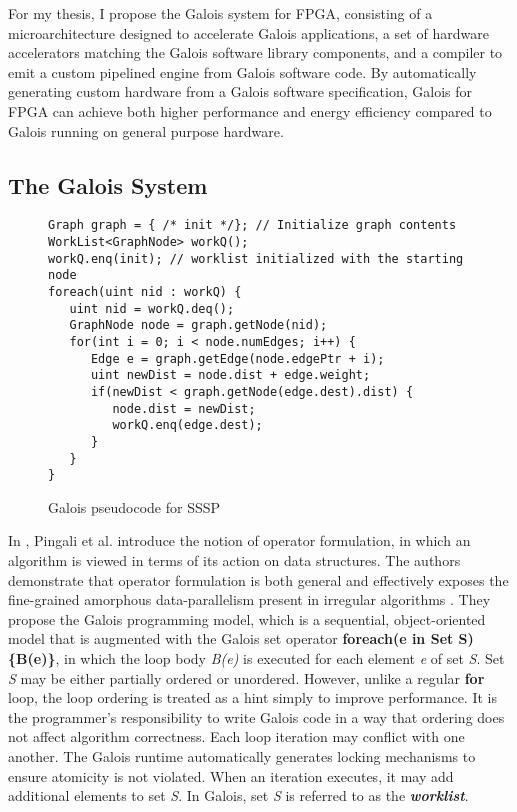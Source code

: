 For my thesis, I propose the Galois system for FPGA, consisting of a microarchitecture designed to accelerate 
Galois applications, a set of hardware accelerators matching the Galois software library components, and a compiler 
to emit a custom pipelined engine from Galois software code. By automatically generating custom hardware from a 
Galois software specification, Galois for FPGA can achieve both higher performance and energy efficiency compared to 
Galois running on general purpose hardware.


\subsection{The Galois System}


\begin{figure}
\centering
\lstset{language=Java}
\begin{lstlisting}
Graph graph = { /* init */}; // Initialize graph contents
WorkList<GraphNode> workQ();
workQ.enq(init); // worklist initialized with the starting node
foreach(uint nid : workQ) {
   uint nid = workQ.deq();
   GraphNode node = graph.getNode(nid);
   for(int i = 0; i < node.numEdges; i++) {
      Edge e = graph.getEdge(node.edgePtr + i);
      uint newDist = node.dist + edge.weight;
      if(newDist < graph.getNode(edge.dest).dist) {
         node.dist = newDist;
         workQ.enq(edge.dest);
      }
   }
}
\end{lstlisting}
\caption{Galois pseudocode for SSSP}
\label{fig:ssspSource}
\end{figure}

In \cite{galois}, Pingali et al. introduce the notion of operator formulation, in which an algorithm is viewed in 
terms of its action on data structures. The authors demonstrate that operator formulation is both general 
\cite{galoisAlgorithms} and effectively exposes the fine-grained amorphous data-parallelism present in irregular 
algorithms \cite{galoisPerf}. They 
propose the Galois programming model, which is a sequential, object-oriented model that is augmented with the 
Galois set operator \textbf{foreach(e in Set S) \{B(e)\}}, in which the loop body \textit{B(e)} is executed for each 
element \textit{e} of set \textit{S}. Set \textit{S} may be either partially ordered or unordered. However, unlike 
a regular \textbf{for} loop, the loop ordering is treated as a hint simply to improve performance. It is the 
programmer's responsibility to write Galois code in a way that ordering does not affect algorithm correctness. Each 
loop iteration may conflict with one another. The Galois runtime automatically generates locking mechanisms to 
ensure atomicity is not violated. When an iteration 
executes, it may add additional elements to set \textit{S}. In Galois, set \textit{S} is referred to as the 
\textbf{\textit{worklist}}.

